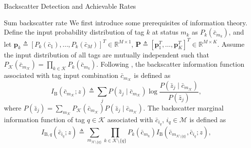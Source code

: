 \documentclass[journal]{IEEEtran}
\begin{document}
\begin{section}{Backscatter Detection and Achievable Rates}
		\begin{subsection}{Sum backscatter rate}
			We first introduce some prerequisites of information theory. Define the input probability distribution of tag $k$ at status $m_k$ as $P_k(\bar{c}_{m_k})$, and let $\boldsymbol{p}_k \triangleq [P_k(\bar{c}_1),\ldots,P_k(\bar{c}_M)]^T \in \mathbb{R}^{M \times 1}$, $\boldsymbol{P} \triangleq [\boldsymbol{p}_1^T,\ldots,\boldsymbol{p}_K^T]^T \in \mathbb{R}^{M \times K}$. Assume the input distribution of all tags are mutually independent such that $P_{\mathcal{K}}(\bar{c}_{m_{\mathcal{K}}}) = \prod_{k \in \mathcal{K}} P_k(\bar{c}_{m_k})$. Following \cite{Rezaeian2004}, the backscatter information function associated with tag input combination $\bar{c}_{m_{\mathcal{K}}}$ is defined as
			\begin{equation}
				I_{\mathrm{B}}(\bar{c}_{m_{\mathcal{K}}};z) \triangleq \sum_j P(\bar{z}_j \mid \bar{c}_{m_{\mathcal{K}}}) \log \frac{P(\bar{z}_j \mid \bar{c}_{m_{\mathcal{K}}})}{P(\bar{z}_j)},
				\label{eq:backscatter_information_function}
			\end{equation}
			where $P(\bar{z}_j) = \sum_{m_{\mathcal{K}}} P_{\mathcal{K}}(\bar{c}_{m_{\mathcal{K}}}) P(\bar{z}_j \mid \bar{c}_{m_{\mathcal{K}}})$.
			The backscatter marginal information function of tag $q \in \mathcal{K}$ associated with $\bar{c}_{i_q}$, $i_q \in \mathcal{M}$ is defined as
			\begin{equation}
				I_{\mathrm{B},q}(\bar{c}_{i_q};z) \triangleq \sum_{m_{\mathcal{K} \setminus \{q\}}} \prod_{k \in \mathcal{K} \setminus \{q\}} P_k(\bar{c}_{m_k}) I_{\mathrm{B}}(\bar{c}_{m_{\mathcal{K} \setminus \{q\}}},\bar{c}_{i_q};z),
				\label{eq:backscatter_marginal_information_function}
			\end{equation}

\end{subsection}
\end{section}
\end{document}

